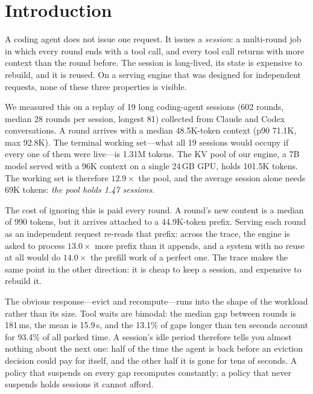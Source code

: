 \section{Introduction}
\label{sec:intro}

A coding agent does not issue one request. It issues a \emph{session}: a multi-round job
in which every round ends with a tool call, and every tool call returns with more context
than the round before. The session is long-lived, its state is expensive to rebuild, and
it is reused. On a serving engine that was designed for independent requests, none of
these three properties is visible.

We measured this on a replay of 19 long coding-agent sessions (602 rounds, median 28
rounds per session, longest 81) collected from Claude and Codex conversations. A round
arrives with a median 48.5K-token context (p90 71.1K, max 92.8K). The terminal working
set---what all 19 sessions would occupy if every one of them were live---is 1.31M tokens.
The KV pool of our engine, a 7B model served with a 96K context on a single 24\,GB GPU,
holds 101.5K tokens. The working set is therefore $12.9\times$ the pool, and the average
session alone needs 69K tokens: \emph{the pool holds 1.47 sessions}.

The cost of ignoring this is paid every round. A round's new content is a median of 990
tokens, but it arrives attached to a 44.9K-token prefix. Serving each round as an
independent request re-reads that prefix: across the trace, the engine is asked to
process $13.0\times$ more prefix than it appends, and a system with no reuse at all would
do $14.0\times$ the prefill work of a perfect one. The trace makes the same point in the
other direction: it is cheap to keep a session, and expensive to rebuild it.

The obvious response---evict and recompute---runs into the shape of the workload rather
than its size. Tool waits are bimodal: the median gap between rounds is 181\,ms, the mean
is 15.9\,s, and the 13.1\% of gaps longer than ten seconds account for 93.4\% of all
parked time. A session's idle period therefore tells you almost nothing about the next
one: half of the time the agent is back before an eviction decision could pay for itself,
and the other half it is gone for tens of seconds. A policy that suspends on every gap
recomputes constantly; a policy that never suspends holds sessions it cannot afford.

